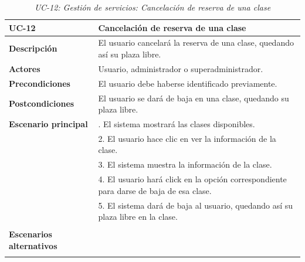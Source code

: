 \begin{table}
  \begin{center}
    \begin{tabularx}{16.4cm}{|l|X|}
      \hline
      \textbf{UC-12} & \textbf{Cancelación de reserva de una clase}\\
      \hline
      \textbf{Descripción} & El usuario cancelará la reserva de una clase, quedando así su plaza libre.\\
      \hline
      \textbf{Actores} & Usuario, administrador o superadministrador.\\
      \hline
      \textbf{Precondiciones} & El usuario debe haberse identificado previamente.\\
      \hline
      \textbf{Postcondiciones} & El usuario se dará de baja en una clase, quedando su plaza libre.\\
      \hline
      \textbf{Escenario principal} & \smallskip 1. El sistema mostrará las clases disponibles.\\
      & 2. El usuario hace clic en ver la información de la clase.\\
      & 3. El sistema muestra la información de la clase.\\
      & 4. El usuario hará click en la opción correspondiente para darse de baja de esa clase.\\
      & 5. El sistema dará de baja al usuario, quedando así su plaza libre en la clase. \\
      & \\
      \hline
      \textbf{Escenarios alternativos} & \\ 
      & \\
      \hline
    \end{tabularx}
    \caption{\textit{UC-12: Gestión de servicios: Cancelación de reserva de una clase}}
    \label{tab:CU-cancelar-reserva-clase}
  \end{center}
\end{table}


